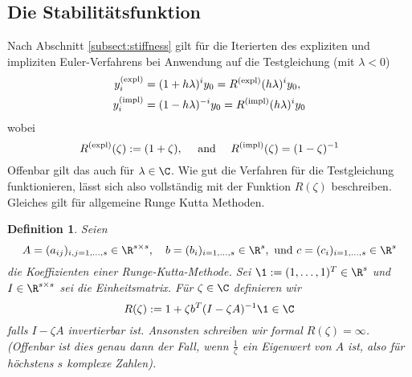 \documentclass[
]{mycourse}
\theoremstyle{mythm}
\newtheorem{definition}[theorem]{Definition}
\theoremstyle{break}
\begin{document}
\subsection{Die Stabilitätsfunktion}

Nach Abschnitt \ref{subsect:stiffness} gilt für die Iterierten des expliziten und impliziten Euler-Verfahrens
bei Anwendung auf die Testgleichung (mit $\lambda<0$)
\begin{align*}
y_i^{\mbox{\scriptsize (expl)}}&=(1+h\lambda )^i y_0=R^{\mbox{\scriptsize (expl)}}(h\lambda)^i y_0,\\
y_i^{\mbox{\scriptsize (impl)}}&=(1-h\lambda )^{-i} y_0=R^{\mbox{\scriptsize (impl)}}(h\lambda)^i y_0
\end{align*}
wobei
\[
R^{\mbox{\scriptsize (expl)}}(\zeta):=(1+\zeta ), \quad \mbox{ and } \quad R^{\mbox{\scriptsize (impl)}}(\zeta)=(1-\zeta )^{-1}
\]
Offenbar gilt das auch für $\lambda\in \C$. Wie gut die Verfahren für die Testgleichung funktionieren, lässt sich also
vollständig mit der Funktion $R(\zeta)$ beschreiben. Gleiches gilt für allgemeine Runge Kutta Methoden.

\begin{definition}
Seien
\[
A=(a_{ij})_{i,j=1,\ldots,s}\in \R^{s\times s},\quad b=(b_i)_{i=1,\ldots,s}\in \R^s, \mbox{ und } c=(c_i)_{i=1,\ldots,s}\in \R^s
\]
die Koeffizienten einer Runge-Kutta-Methode. Sei
 $\1:=(1,\ldots,1)^T\in \R^s$ und $I\in \R^{s\times s}$ sei die Einheitsmatrix. Für $\zeta\in \C$ definieren wir
\[
R(\zeta):=1+\zeta b^T (I-\zeta A)^{-1} \1\in \C
\]
falls $I-\zeta A$ invertierbar ist. Ansonsten schreiben wir formal $R(\zeta)=\infty$.
(Offenbar ist dies genau dann der Fall, wenn $\frac{1}{\zeta}$ ein Eigenwert von $A$ ist,
also für höchstens $s$ komplexe Zahlen).
\end{definition}
\end{document}
